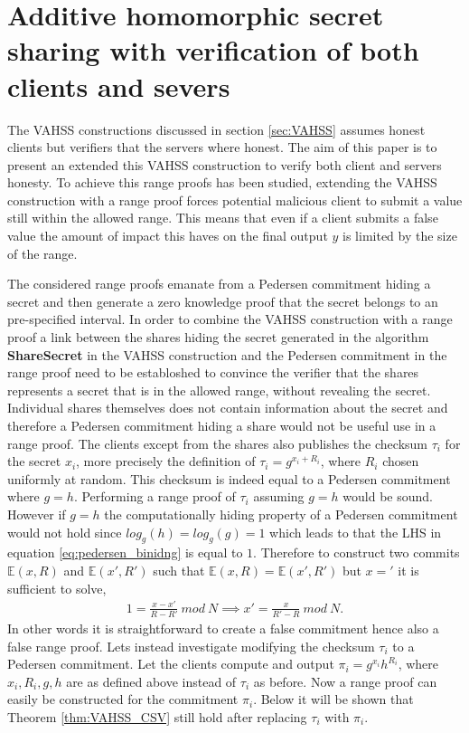 \section{Additive homomorphic secret sharing with verification of both clients and severs }
\label{sec:combination}

The  VAHSS constructions  discussed in section \ref{sec:VAHSS} assumes honest clients but verifiers that the servers where honest. The aim of this paper is to present an extended this VAHSS construction to verify both client and servers honesty.  To achieve this range proofs has been studied, extending the VAHSS construction with a range proof  forces potential malicious client to submit a value still within the allowed range. This means that even if a client submits a false value the amount of impact this haves on the final output $y$ is limited by the size of the range.

The considered range proofs emanate from a Pedersen commitment hiding a secret and then generate a zero knowledge proof that the secret belongs to an pre-specified interval. In order to combine the VAHSS construction with a range proof a link between the shares hiding the secret generated in the algorithm \textbf{ShareSecret} in the VAHSS construction and  the Pedersen commitment in the range proof need to be establoshed to convince the verifier that the shares  represents a secret that is in the allowed range, without revealing the secret. Individual shares themselves does not contain information about the secret and therefore a Pedersen commitment hiding a share would not be useful use in a range proof. The clients except from the shares also publishes the checksum $\tau_i$ for the secret $x_i$, more precisely the definition of $\tau_i=g^{x_i+R_i}$, where $R_i$ chosen uniformly at random. This checksum is indeed equal to a Pedersen commitment where $g=h$. Performing a range proof of $\tau_i$ assuming $g=h$ would be sound. However if $g=h$ the computationally hiding property of a Pedersen commitment would not hold since $log_g(h)=log_g(g)=1$ which leads to that the LHS in equation \ref{eq:pedersen_binidng} is equal to $1$. Therefore to construct two commits $\mathds{E}(x,R)$ and $\mathds{E}(x',R')$ such that $\mathds{E}(x,R) = \mathds{E}(x',R')$ but $x='$ it is sufficient to solve, 
\begin{align*}
1 = \frac{x-x'}{R-R'}\:mod \:N \implies x' = \frac{x}{R'-R} \:mod\: N.
\end{align*}
In other words it is straightforward to create a false commitment hence also a false range proof. Lets instead investigate modifying the checksum $\tau_i$ to a Pedersen commitment. Let the clients compute and output $\pi_i=g^{x_i}h^{R_i}$, where $x_i,R_i,g,h$ are as defined above instead of $\tau_i$ as before.  Now a range proof can easily be constructed for the commitment $\pi_i$. Below it will be shown that Theorem \ref{thm:VAHSS_CSV} still hold after replacing $\tau_i$ with $\pi_i$. 

